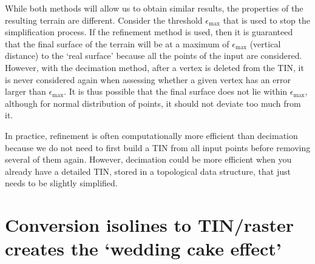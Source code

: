 %

While both methods will allow us to obtain similar results, the properties of the resulting terrain are different.
Consider the threshold $\epsilon_{\max}$ that is used to stop the simplification process.
If the refinement method is used, then it is guaranteed that the final surface of the terrain will be at a maximum of $\epsilon_{\max}$ (vertical distance) to the `real surface' because all the points of the input are considered.
However, with the decimation method, after a vertex is deleted from the TIN, it is never considered again when assessing whether a given vertex has an error larger than $\epsilon_{\max}$. 
It is thus possible that the final surface does not lie within $\epsilon_{\max}$, although for normal distribution of points, it should not deviate too much from it.

%

In practice, refinement is often computationally more efficient than decimation because we do not need to first build a TIN from all input points before removing several of them again. 
However, decimation could be more efficient when you already have a detailed TIN, stored in a topological data structure, that just needs to be slightly simplified.

%
\section[Wedding cake effect]{Conversion isolines to TIN/raster creates the `wedding cake effect'}%
\label{sec:weddingcake}

